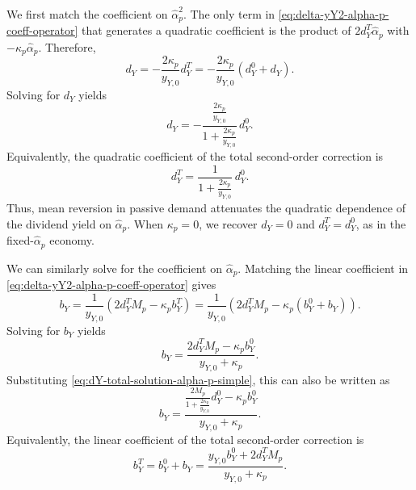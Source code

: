 We first match the coefficient on $\hat{\alpha}_p^2$.
The only term in \eqref{eq:delta-yY2-alpha-p-coeff-operator} that generates a quadratic coefficient is the product of $2d_Y^T\hat{\alpha}_p$ with $-\kappa_p\hat{\alpha}_p$.
Therefore,
\begin{equation}
    d_Y
    =-\frac{2\kappa_p}{y_{Y,0}}d_Y^T
    =-\frac{2\kappa_p}{y_{Y,0}}(d_Y^{0}+d_Y).
\end{equation}
Solving for $d_Y$ yields
\begin{equation}\label{eq:dY-solution-alpha-p-simple}
    d_Y
    =-\frac{\frac{2\kappa_p}{y_{Y,0}}}{1+\frac{2\kappa_p}{y_{Y,0}}}\,d_Y^{0}.
\end{equation}
Equivalently, the quadratic coefficient of the total second-order correction is
\begin{equation}\label{eq:dY-total-solution-alpha-p-simple}
    d_Y^T
    =\frac{1}{1+\frac{2\kappa_p}{y_{Y,0}}}\,d_Y^{0}.
\end{equation}
Thus, mean reversion in passive demand attenuates the quadratic dependence of the dividend yield on $\hat{\alpha}_p$.
When $\kappa_p=0$, we recover $d_Y=0$ and $d_Y^T=d_Y^{0}$, as in the fixed-$\hat{\alpha}_p$ economy.

We can similarly solve for the coefficient on $\hat{\alpha}_p$.
Matching the linear coefficient in \eqref{eq:delta-yY2-alpha-p-coeff-operator} gives
\begin{equation}
    b_Y
    =\frac{1}{y_{Y,0}}\left(2d_Y^T M_p-\kappa_p b_Y^T\right)
    =\frac{1}{y_{Y,0}}\left(2d_Y^T M_p-\kappa_p(b_Y^{0}+b_Y)\right).
\end{equation}
Solving for $b_Y$ yields
\begin{equation}\label{eq:bY-solution-alpha-p-simple}
    b_Y
    =\frac{2d_Y^T M_p-\kappa_p b_Y^{0}}{y_{Y,0}+\kappa_p}.
\end{equation}
Substituting \eqref{eq:dY-total-solution-alpha-p-simple}, this can also be written as
\begin{equation}\label{eq:bY-solution-alpha-p-substituted}
    b_Y
    =\frac{\frac{2M_p}{1+\frac{2\kappa_p}{y_{Y,0}}}d_Y^{0}-\kappa_p b_Y^{0}}{y_{Y,0}+\kappa_p}.
\end{equation}
Equivalently, the linear coefficient of the total second-order correction is
\begin{equation}\label{eq:bY-total-solution-alpha-p-simple}
    b_Y^T
    =b_Y^{0}+b_Y
    =\frac{y_{Y,0}b_Y^{0}+2d_Y^T M_p}{y_{Y,0}+\kappa_p}.
\end{equation}

